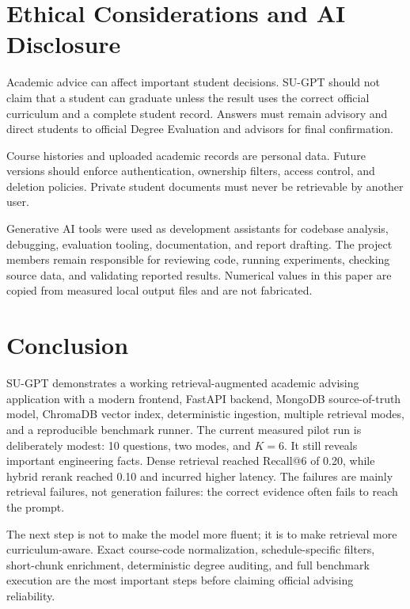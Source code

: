 \documentclass[11pt]{article}
\begin{document}
\section{Ethical Considerations and AI Disclosure}
Academic advice can affect important student decisions. SU-GPT should not claim that a student can graduate unless the result uses the correct official curriculum and a complete student record. Answers must remain advisory and direct students to official Degree Evaluation and advisors for final confirmation.

Course histories and uploaded academic records are personal data. Future versions should enforce authentication, ownership filters, access control, and deletion policies. Private student documents must never be retrievable by another user.

Generative AI tools were used as development assistants for codebase analysis, debugging, evaluation tooling, documentation, and report drafting. The project members remain responsible for reviewing code, running experiments, checking source data, and validating reported results. Numerical values in this paper are copied from measured local output files and are not fabricated.

\section{Conclusion}
SU-GPT demonstrates a working retrieval-augmented academic advising application with a modern frontend, FastAPI backend, MongoDB source-of-truth model, ChromaDB vector index, deterministic ingestion, multiple retrieval modes, and a reproducible benchmark runner. The current measured pilot run is deliberately modest: 10 questions, two modes, and $K=6$. It still reveals important engineering facts. Dense retrieval reached Recall@6 of 0.20, while hybrid rerank reached 0.10 and incurred higher latency. The failures are mainly retrieval failures, not generation failures: the correct evidence often fails to reach the prompt.

The next step is not to make the model more fluent; it is to make retrieval more curriculum-aware. Exact course-code normalization, schedule-specific filters, short-chunk enrichment, deterministic degree auditing, and full benchmark execution are the most important steps before claiming official advising reliability.
\end{document}
